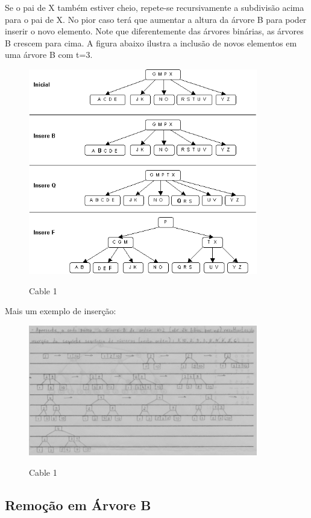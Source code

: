 \documentclass{article}
\begin{document}
Se o pai de X também estiver cheio, repete-se recursivamente a subdivisão acima para o pai de X. No
pior caso terá que aumentar a altura da árvore B para poder inserir o novo elemento.
Note que diferentemente das árvores binárias, as árvores B crescem para cima. A figura abaixo
ilustra a inclusão de novos elementos em uma árvore B com t=3.

\begin{figure}[h]
    \center
    \includegraphics[width=10cm]{imagens/arvb4.png}
    \label{cable}
    \caption{Cable 1}
\end{figure}

\newpage

Mais um exemplo de inserção:
\begin{figure}[h]
    \center
    \includegraphics[width=10cm]{imagens/arvb8.png}
    \label{cable}
    \caption{Cable 1}
\end{figure}

\newpage

\subsection{Remoção em Árvore B}
\end{document}
